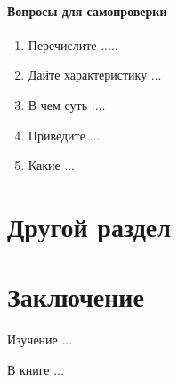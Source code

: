 \documentclass[12pt, openany, twoside, final]{extbook} %
\newenvironment{questions}{\subsubsection*{Вопросы для самопроверки}\begin{enumerate}\itemsep0pt minus 0.3pt\parskip0pt plus 0.3pt}{\end{enumerate}}
\begin{document}
\begin{questions}
\item{} Перечислите .....
\item{} Дайте характеристику ...
\item{} В чем суть ....
\item{} Приведите ...
\item{} Какие ...
\end{questions}

\chapter{Другой раздел}


\chapter*{Заключение}


Изучение ...

В книге ...
\end{document}
